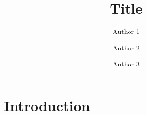 \documentclass{article}
\title{Title}
\author[1] {Author 1}
\author[2] {Author 2}
\author[2, 3] {Author 3}
\affil[1]{\small Afil 1}
\affil[2]{\small Afil 2}
\affil[3]{\small Afil 3}
\date{ }
\begin{document}
\maketitle
\linenumbers
\vspace{-5mm}
\begin{abstract}
\vspace{3mm}
\Keywords{}
\end{abstract}

\section{Introduction}
\label{sec:intro}

\cite{boyles2020transportation}

\newpage

\end{document}
